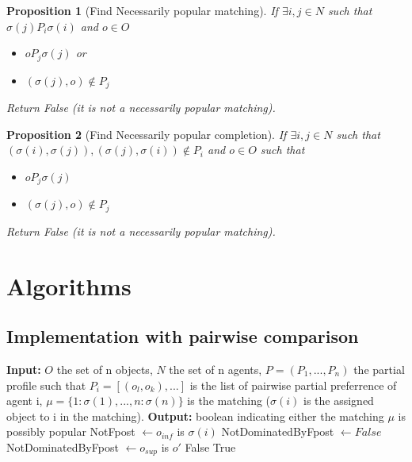 \documentclass{article}
\newtheorem{proposition}{Proposition}
\begin{document}
\begin{proposition}[Find Necessarily popular matching]
If $\exists i,j \in N$ such that $\sigma(j) P_i \sigma(i)$ and $o \in O$
\begin{itemize}
    \item $o P_j \sigma(j)$ or
    \item $(\sigma(j),o) \notin P_j$
\end{itemize}
Return False (it is not a necessarily popular matching).
\end{proposition}
\begin{proposition}[Find Necessarily popular completion]
If $\exists i,j \in N$ such that \\ $(\sigma(i), \sigma(j)), (\sigma(j), \sigma(i)) \notin P_i$ and $o \in O$ such that
\begin{itemize}
    \item $o P_j \sigma(j)$
    \item $(\sigma(j),o) \notin P_j$
\end{itemize}
Return False (it is not a necessarily popular matching).
\end{proposition}



\section{Algorithms}

\subsection{Implementation with pairwise comparison}
\begin{algorithm}[H]
\caption{VerifPossiblyPopularMatching}
\begin{algorithmic}[1]
    \State \textbf{Input:} $O$ the set of n objects, $N$ the set of n agents, $P = (P_1, ..., P_n)$ the partial profile such that $P_i = [(o_l, o_k), ...]$ is the list of pairwise partial preferrence of agent i, $\mu = \{1\colon \sigma(1), ..., n\colon \sigma(n)\}$ is the matching ($\sigma(i)$ is the assigned object to i in the matching). 
    \State \textbf{Output:} boolean indicating either the matching $\mu$ is possibly popular
            \State NotFpost $\leftarrow o_{inf}$ is $\sigma(i)$
            \State NotDominatedByFpost  $\leftarrow False $
                \State NotDominatedByFpost $\leftarrow o_{sup}$ is $o'$
            \EndFor
                \State \Return False
            \EndIf
        \EndFor
    \EndFor
    \State \Return True
\end{algorithmic}
\end{algorithm}
\end{document}
